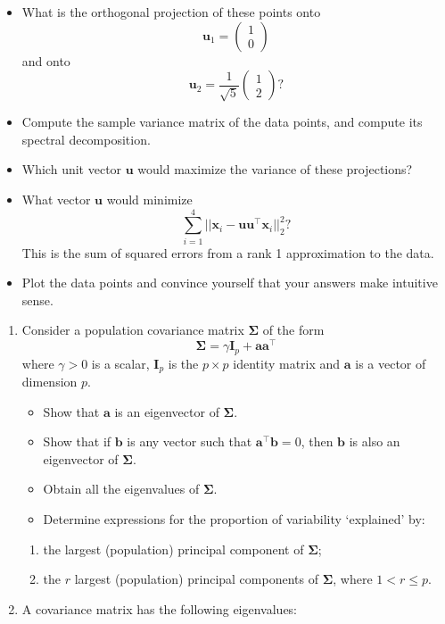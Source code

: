 \documentclass[
]{book}
\providecommand{\tightlist}{%
  \setlength{\itemsep}{0pt}\setlength{\parskip}{0pt}}
\theoremstyle{definition}
\theoremstyle{definition}
\theoremstyle{definition}
\theoremstyle{definition}
\theoremstyle{remark}
\begin{document}
\begin{itemize}
\item
  What is the orthogonal projection of these points onto \[\mathbf u_1 = \begin{pmatrix}1\\0\end{pmatrix}\] and onto \[\mathbf u_2 =\frac{1}{\sqrt{5}}\begin{pmatrix}1\\2\end{pmatrix}?\]
\item
  Compute the sample variance matrix of the data points, and compute its spectral decomposition.
\item
  Which unit vector \(\mathbf u\) would maximize the variance of these projections?
\item
  What vector \(\mathbf u\) would minimize
  \[\sum_{i=1}^4 ||\mathbf x_i -\mathbf u\mathbf u^\top \mathbf x_i||^2_2?\]
  This is the sum of squared errors from a rank 1 approximation to the data.
\item
  Plot the data points and convince yourself that your answers make intuitive sense.
\end{itemize}

\begin{enumerate}
\def\labelenumi{\arabic{enumi}.}
\setcounter{enumi}{1}
\tightlist
\item
  Consider a population covariance matrix \(\boldsymbol{\Sigma}\) of the form
  \[\boldsymbol{\Sigma}=\gamma \mathbf I_p + \mathbf a\mathbf a^\top\]
  where \(\gamma>0\) is a scalar, \(\mathbf I_p\) is the \(p \times p\) identity matrix and \(\mathbf a\) is a vector of dimension \(p\).

  \begin{itemize}
  \tightlist
  \item
    Show that \(\mathbf a\) is an eigenvector of \(\boldsymbol{\Sigma}\).
  \item
    Show that if \(\mathbf b\) is any vector such that \(\mathbf a^\top \mathbf b=0\), then \(\mathbf b\) is also an eigenvector of \(\boldsymbol{\Sigma}\).
  \item
    Obtain all the eigenvalues of \(\boldsymbol{\Sigma}\).
  \item
    Determine expressions for the proportion of variability `explained' by:
  \end{itemize}

  \begin{enumerate}
  \def\labelenumii{\roman{enumii}.}
  \tightlist
  \item
    the largest (population) principal component of \(\boldsymbol{\Sigma}\);
  \item
    the \(r\) largest (population) principal components of \(\boldsymbol{\Sigma}\), where \(1 < r \leq p\).
  \end{enumerate}
\item
  A covariance matrix has the following eigenvalues:
\end{enumerate}
\end{document}

